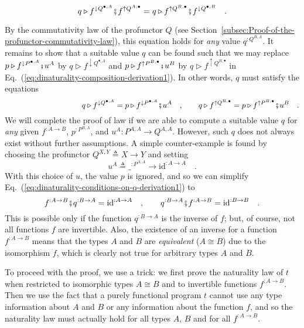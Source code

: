 ~
\[
q\triangleright f^{\downarrow Q^{\bullet,A}}\bef f^{\uparrow Q^{A,\bullet}}=q\triangleright f^{\uparrow Q^{B,\bullet}}\bef f^{\downarrow Q^{\bullet,B}}\quad.
\]

\noindent By the commutativity law of the profunctor $Q$ (see Section~\ref{subsec:Proof-of-the-profunctor-commutativity-law}),
this equation holds for \emph{any} value $q^{:Q^{B,A}}$. It remains
to show that a suitable value $q$ can be found such that we may replace
$p\triangleright f^{\downarrow P^{\bullet,A}}\bef u^{A}$ by $q\triangleright f^{\downarrow Q^{\bullet,A}}$
and $p\triangleright f^{\uparrow P^{B,\bullet}}\bef u^{B}$ by $q\triangleright f^{\uparrow Q^{B,\bullet}}$
in Eq.~(\ref{eq:dinaturality-composition-derivation1}). In other
words, $q$ must satisfy the equations
\begin{equation}
\quad\quad\quad\quad\quad\quad\quad\quad\quad\quad q\triangleright f^{\downarrow Q^{\bullet,A}}=p\triangleright f^{\downarrow P^{\bullet,A}}\bef u^{A}\quad,\quad\quad q\triangleright f^{\uparrow Q^{B,\bullet}}=p\triangleright f^{\uparrow P^{B,\bullet}}\bef u^{B}\quad.\label{eq:dinaturality-conditions-on-q-derivation1}
\end{equation}
We will complete the proof of law if we are able to compute a suitable
value $q$ for \emph{any} given $f^{:A\rightarrow B}$, $p^{:P^{B,A}}$,
and $u^{A}:P^{A,A}\rightarrow Q^{A,A}$. However, such $q$ does not
always exist without further assumptions. A simple counter-example
is found by choosing the profunctor $Q^{X,Y}\triangleq X\rightarrow Y$
and setting
\[
u^{A}\triangleq\_^{:P^{A,A}}\rightarrow\text{id}^{:A\rightarrow A}\quad.
\]
With this choice of $u$, the value $p$ is ignored, and so we can
simplify Eq.~(\ref{eq:dinaturality-conditions-on-q-derivation1})
to
\[
f^{:A\rightarrow B}\bef q^{:B\rightarrow A}=\text{id}^{:A\rightarrow A}\quad,\quad\quad q^{:B\rightarrow A}\bef f^{:A\rightarrow B}=\text{id}^{:B\rightarrow B}\quad.
\]
This is possible only if the function $q^{:B\rightarrow A}$ is the
inverse of $f$; but, of course, not all functions $f$ are invertible.
Also, the existence of an inverse for a function $f^{:A\rightarrow B}$
means that the types $A$ and $B$ are \emph{equivalent} ($A\cong B$)
due to the isomorphism $f$, which is clearly not true for arbitrary
types $A$ and $B$.

To proceed with the proof, we use a trick: we first prove the naturality
law of $t$ when restricted to isomorphic types $A\cong B$ and to
invertible functions $f^{:A\rightarrow B}$. Then we use the fact
that a purely functional program $t$ cannot use any type information
about $A$ and $B$ or any information about the function $f$, and
so the naturality law must actually hold for all types $A$, $B$
and for all $f^{:A\rightarrow B}$.

